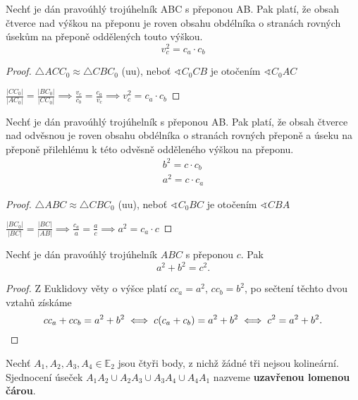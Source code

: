 \begin{veta}
  Nechť je dán pravoúhlý trojúhelník ABC s přeponou AB. Pak platí, že obsah čtverce nad výškou na přeponu je roven obsahu obdélníka o stranách rovných úsekům na přeponě oddělených touto výškou.
  $$v_c^2 = c_a \cdot c_b$$
\end{veta}

\begin{proof}
  $\triangle ACC_0 \approx \triangle CBC_0$ (uu), neboť $\sphericalangle C_0 CB$ je otočením $\sphericalangle C_0 AC$

  $\frac{|CC_0|}{|AC_0|} = \frac{|BC_0|}{|CC_0|} \implies \frac{v_c}{c_b} = \frac{c_a}{v_c} \implies v_c^2 = c_a \cdot c_b$
\end{proof}

\begin{veta}
  Nechť je dán pravoúhlý trojúhelník s přeponou AB. Pak platí, že obsah čtverce nad odvěsnou je roven obsahu obdélníka o stranách rovných přeponě a úseku na přeponě přilehlému k této odvěsně odděleného výškou na přeponu.
  \begin{align*}
    b^2 = c \cdot c_b\\
    a^2 = c \cdot c_a
  \end{align*}
\end{veta}

\begin{proof}
  $\triangle ABC \approx \triangle CBC_0$ (uu), neboť $\sphericalangle C_0 BC$ je otočením $\sphericalangle CBA$

  $\frac{|BC_0|}{|BC|} = \frac{|BC|}{|AB|} \implies \frac{c_a}{a} = \frac{a}{c} \implies a^2 = c_a \cdot c$
\end{proof}

\begin{veta}[Pythagorova]
  Nechť je dán pravoúhlý trojúhelník $ABC$ s přeponou $c$. Pak
  \[
    a^2+b^2 = c^2.
  \]
\end{veta}


\begin{proof}
  Z Euklidovy věty o výšce platí $cc_a=a^2$, $cc_b=b^2$, po sečtení těchto dvou vztahů získáme
  \[
    cc_a+cc_b=a^2+b^2 \iff c(c_a+c_b)=a^2+b^2 \iff c^2=a^2+b^2. \qedhere
  \]
\end{proof}

\begin{definition}
  Nechť $A_1,A_2, A_3, A_4 \in \mathbb E_2$ jsou čtyři body, z nichž žádné tři nejsou kolineární. Sjednocení úseček $A_1A_2\cup A_2A_3 \cup A_3A_4 \cup A_4A_1$ nazveme \textbf{uzavřenou lomenou čárou}.
\end{definition}

